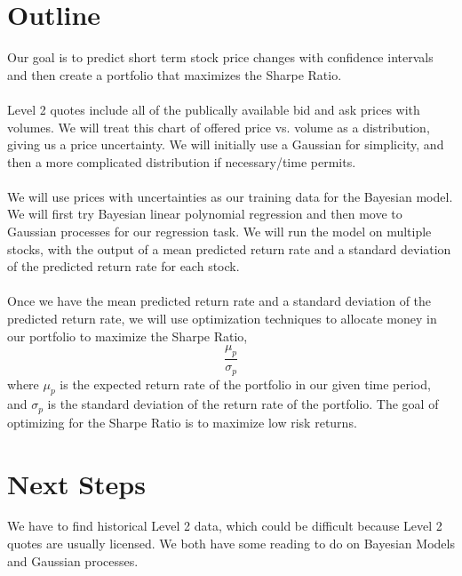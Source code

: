\documentclass[12pt]{article}
\begin{document}
\maketitle

\section{Outline}
Our goal is to predict short term stock price changes with confidence intervals and then create a portfolio that maximizes the Sharpe Ratio. 
\\\\
Level 2 quotes include all of the publically available bid and ask prices with volumes. We will treat this chart of offered price vs. volume as a distribution, giving us a price uncertainty. We will initially use a Gaussian for simplicity, and then a more complicated distribution if necessary/time permits. 
\\\\
We will use prices with uncertainties as our training data for the Bayesian model. We will first try Bayesian linear polynomial regression and then move to Gaussian processes for our regression task. We will run the model on multiple stocks, with the output of a mean predicted return rate and a standard deviation of the predicted return rate for each stock.
\\\\
Once we have the mean predicted return rate and a standard deviation of the predicted return rate, we will use optimization techniques to allocate money in our portfolio to maximize the Sharpe Ratio, 
	$$\frac{\mu_p}{\sigma_p}$$
where $\mu_p$ is the expected return rate of the portfolio in our given time period, and $\sigma_p$ is the standard deviation of the return rate of the portfolio. The goal of optimizing for the Sharpe Ratio is to maximize low risk returns.

\section{Next Steps}
We have to find historical Level 2 data, which could be difficult because Level 2 quotes are usually licensed. We both have some reading to do on Bayesian Models and Gaussian processes.
\end{document}

